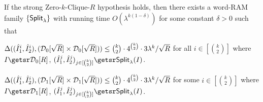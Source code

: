 \begin{theorem}
\label{thm:split}
If the strong Zero-$k$-Clique-$R$ hypothesis holds, then there exists a word-RAM family $\{{\mathsf{Split}}_\lambda\}$ with running time $O(\lambda^{k(1-\delta)})$ for some constant $\delta > 0$ such that
	\begin{compactitem}
	\item $\Delta((\hat{I}_1^i, \hat{I}_2^i),(\mathcal{D}_0[\sqrt{R}] \times \mathcal{D}_0[\sqrt{R}]))\leq \binom{k}{2}\cdot 4^{\binom{k}{2}}\cdot3\lambda^k/\sqrt{R}$ for all $i \in [\binom{k}{2}]$ where
		$I \getsr \zkcdistzero{R}$, $(\hat{\instance}_1^j, \hat{\instance}_2^j)_{j \in [\binom{k}{2}]}\getsr\Split(I)$.
	\item $\Delta((\hat{I}_1^i, \hat{I}_2^i),(\mathcal{D}_1[\sqrt{R}] \times \mathcal{D}_1[\sqrt{R}]))\leq \binom{k}{2}\cdot 4^{\binom{k}{2}}\cdot3\lambda^k/\sqrt{R}$ for some $i\in[\binom{k}{2}]$ where
		$I \getsr \zkcdistone{R}$, $(\hat{\instance}_1^j, \hat{\instance}_2^j)_{j \in [\binom{k}{2}]}\getsr\Split(I)$.
	\end{compactitem}
\end{theorem}


